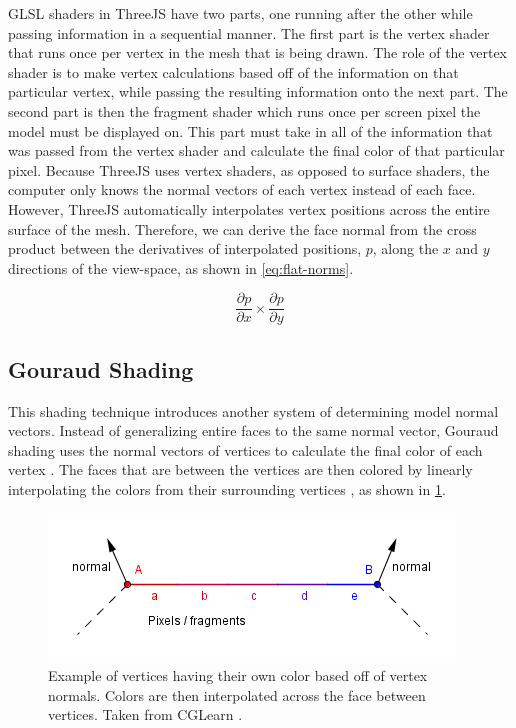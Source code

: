 \documentclass[10pt,twocolumn,letterpaper]{article}
\begin{document}
GLSL shaders in ThreeJS have two parts, one running after the other while passing information in a sequential manner. The first part is the vertex shader that runs once per vertex in the mesh that is being drawn. The role of the vertex shader is to make vertex calculations based off of the information on that particular vertex, while passing the resulting information onto the next part. The second part is then the fragment shader which runs once per screen pixel the model must be displayed on. This part must take in all of the information that was passed from the vertex shader and calculate the final color of that particular pixel. Because ThreeJS uses vertex shaders, as opposed to surface shaders, the computer only knows the normal vectors of each vertex instead of each face. However, ThreeJS automatically interpolates vertex positions across the entire surface of the mesh. Therefore, we can derive the face normal from the cross product between the derivatives of interpolated positions, $p$, along the $x$ and $y$ directions of the view-space, as shown in \cref{eq:flat-norms}.

\begin{equation}
    \frac{\partial p}{\partial x} \times \frac{\partial p}{\partial y}
    \label{eq:flat-norms}
\end{equation}

\subsection{Gouraud Shading}

This shading technique introduces another system of determining model normal vectors. Instead of generalizing entire faces to the same normal vector, Gouraud shading uses the normal vectors of vertices to calculate the final color of each vertex \cite{wiki:Shading}. The faces that are between the vertices are then colored by linearly interpolating the colors from their surrounding vertices \cite{cglearn}, as shown in \cref{fig:gouraud}.

\begin{figure}[t]
  \centering
  \includegraphics[width=1\linewidth]{gouraudShading.png}

   \caption{Example of vertices having their own color based off of vertex normals. Colors are then interpolated across the face between vertices. Taken from CGLearn \cite{cglearn}.}
   \label{fig:gouraud}
\end{figure}
\end{document}

